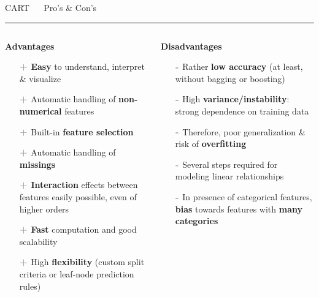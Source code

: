 \documentclass[11pt,compress,t,notes=noshow, xcolor=table]{beamer}
\begin{document}
\LARGE
\begin{frame}{\textcolor{gray!80}{CART} ~~ Pro's \& Con's}
\normalsize
\vspace{-0.5cm}
\noindent \textcolor{gray!80}{\rule{\textwidth}{1pt}}

\vspace{0.3cm}

\begin{columns}[onlytextwidth]
  \begin{column}{0.5\textwidth}
    \textbf{\textcolor{gray!80}{Advantages}}
    \footnotesize
    \begin{itemize}
      \item[$\textbf{\textcolor{gray!80}{+}}$] \textbf{Easy} to understand, 
      interpret \& visualize
      \item[$\textbf{\textcolor{gray!80}{+}}$] Automatic handling of 
      \textbf{non-numerical} features
      \item[$\textbf{\textcolor{gray!80}{+}}$] Built-in \textbf{feature 
      selection}
      \item[$\textbf{\textcolor{gray!80}{+}}$] Automatic handling of 
      \textbf{missings} 
      \item[$\textbf{\textcolor{gray!80}{+}}$] \textbf{Interaction} effects 
      between features easily possible, even of higher orders
      \item[$\textbf{\textcolor{gray!80}{+}}$] \textbf{Fast} computation and 
      good scalability
      \item[$\textbf{\textcolor{gray!80}{+}}$] High \textbf{flexibility} (custom 
      split criteria or leaf-node prediction rules)   
    \end{itemize}
  \end{column}
  \begin{column}{0.5\textwidth}
    \textbf{\textcolor{gray!80}{Disadvantages}}
    \footnotesize
    \begin{itemize}
      \item[$\textbf{\textcolor{gray!80}{-}}$] Rather \textbf{low accuracy} (at 
      least, without bagging or boosting)
      \item[$\textbf{\textcolor{gray!80}{-}}$] High 
      \textbf{variance/instability}: strong dependence on training data
      \item[$\textbf{\textcolor{gray!80}{-}}$] Therefore, poor generalization \& 
      risk of \textbf{overfitting}
      \item[$\textbf{\textcolor{gray!80}{-}}$] Several steps required for
      modeling linear relationships
      \item[$\textbf{\textcolor{gray!80}{-}}$] In presence of categorical 
      features, \textbf{bias} towards features with \textbf{many categories}
    \end{itemize}
  \end{column}
\end{columns}

\vfill

\small


\end{frame}
\end{document}
